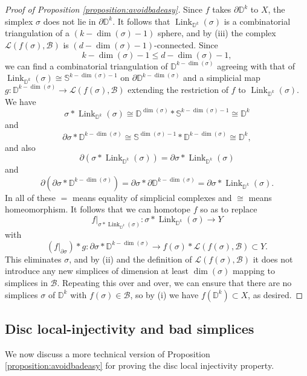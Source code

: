 \documentclass[11pt]{amsart}
\numberwithin{equation}{section}
\theoremstyle{plain}
\theoremstyle{definition}
\theoremstyle{remark}
\newcommand\cB{\ensuremath{\mathcal{B}}}
\newcommand\cL{\ensuremath{\mathcal{L}}}
\newcommand\bbD{\ensuremath{\mathbb{D}}}
\newcommand\bbS{\ensuremath{\mathbb{S}}}
\DeclareMathOperator{\Link}{Link}
\begin{document}
\begin{proof}[Proof of Proposition \ref{proposition:avoidbadeasy}]
Since $f$ takes $\partial \bbD^k$ to $X$, the simplex $\sigma$ does not lie in $\partial \bbD^k$.
It follows that $\Link_{\bbD^k}(\sigma)$ is a combinatorial
triangulation of a $(k-\dim(\sigma)-1)$ sphere, and by 
(iii) the complex $\cL(f(\sigma),\cB)$ is $(d-\dim(\sigma)-1)$-connected.  Since
\[k-\dim(\sigma)-1 \leq d-\dim(\sigma)-1,\]
we can find a combinatorial triangulation of $\bbD^{k-\dim(\sigma)}$ agreeing with that of 
$\Link_{\bbD^k}(\sigma) \cong \bbS^{k-\dim(\sigma)-1}$ on
$\partial \bbD^{k-\dim(\sigma)}$ and a simplicial map $g\colon \bbD^{k-\dim(\sigma)} \rightarrow \cL(f(\sigma),\cB)$
extending the restriction of $f$ to $\Link_{\bbD^k}(\sigma)$.  We have
\[\sigma \ast \Link_{\bbD^k}\left(\sigma\right) \cong \bbD^{\dim(\sigma)} \ast \bbS^{k-\dim(\sigma)-1} \cong \bbD^k\]
and
\[\partial \sigma \ast \bbD^{k-\dim(\sigma)} \cong \bbS^{\dim(\sigma)-1} \ast \bbD^{k-\dim(\sigma)} \cong \bbD^k,\]
and also
\[\partial\left(\sigma \ast \Link_{\bbD^k}\left(\sigma\right)\right) = \partial \sigma \ast \Link_{\bbD^k}\left(\sigma\right)\]
and
\[\partial\left(\partial \sigma \ast \bbD^{k-\dim(\sigma)}\right) = \partial \sigma \ast \partial \bbD^{k-\dim(\sigma)} = \partial \sigma \ast \Link_{\bbD^k}(\sigma).\]
In all of these $=$ means equality of simplicial complexes and $\cong$ means homeomorphism.  It follows that we can homotope
$f$ so as to replace
\[f|_{\sigma \ast \Link_{\bbD^k}(\sigma)}\colon \sigma \ast \Link_{\bbD^k}(\sigma) \rightarrow Y\]
with
\[\left(f|_{\partial \sigma}\right) \ast g \colon \partial \sigma \ast \bbD^{k-\dim(\sigma)} \rightarrow f(\sigma) \ast \cL(f(\sigma),\cB) \subset Y.\]
This eliminates $\sigma$, and by (ii) and the definition of $\cL(f(\sigma),\cB)$ it does not introduce
any new simplices of dimension at least $\dim(\sigma)$ mapping to simplices in $\cB$.
Repeating this over and over, we can ensure that there are no simplices $\sigma$ of $\bbD^k$
with $f(\sigma) \in \cB$, so by (i) we have $f(\bbD^k) \subset X$, as desired.
\end{proof}

\subsection{Disc local-injectivity and bad simplices}
We now discuss a more technical version of Proposition \ref{proposition:avoidbadeasy} for
proving the disc local injectivity property.
\end{document}
